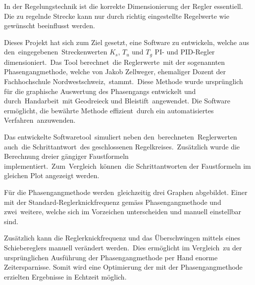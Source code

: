 In  der   Regelungstechnik  ist   die  korrekte  Dimensionierung   der  Regler
essentiell. Die  zu  regelnde  Strecke  kann nur  durch  richtig  eingestellte
Regelwerte wie gew\"unscht beeinflusst werden. 
 

Dieses  Projekt  hat sich  zum  Ziel  gesetzt,  eine Software  zu  entwickeln,
welche  aus   den eingegebenen Streckenwerten  $K_s$,  $T_u$  und   $T_g$  PI-
und  PID-Regler  dimensioniert. Das  Tool  berechnet die  Reglerwerte mit  der
sogenannten   Phasengangmethode,  welche   von  Jakob   Zellweger,  ehemaliger
Dozent   der  Fachhochschule   Nordwestschweiz, stammt. Diese  Methode   wurde
urspr\"unglich  f\"ur die  graphische  Auswertung  des Phasengangs  entwickelt
und  durch Handarbeit mit  Geodreieck und  Bleistift angewendet. Die  Software
erm\"oglicht,  die  bew\"ahrte  Methode  effizient durch  ein  automatisiertes
Verfahren anzuwenden.
 

Das  entwickelte   Softwaretool simuliert  neben  den berechneten Reglerwerten
auch die    Schrittantwort des     geschlossenen    Regelkreises. Zus\"atzlich
wurde      die       Berechnung      dreier       g\"angiger      Faustformeln
implementiert. Zum Vergleich k\"onnen die Schrittantworten der Faustformeln im
gleichen Plot angezeigt werden.


F\"ur die Phasengangmethode werden gleichzeitig drei Graphen abgebildet. Einer
mit   der   Standard-Reglerknickfrequenz    gem\"ass   Phasengangmethode   und
zwei weitere, welche sich im  Vorzeichen unterscheiden und manuell einstellbar
sind.
 

Zus\"atzlich  kann die  Reglerknickfrequenz  und  das \"Uberschwingen  mittels
eines   Schiebereglers  manuell   ver\"andert  werden. Dies   erm\"oglicht  im
Vergleich zu  der  urspr\"unglichen  Ausf\"uhrung  der  Phasengangmethode  per
Hand  enorme  Zeitersparnisse.   Somit  wird  eine  Optimierung  der  mit  der
Phasengangmethode erzielten Ergebnisse in Echtzeit m\"oglich.
